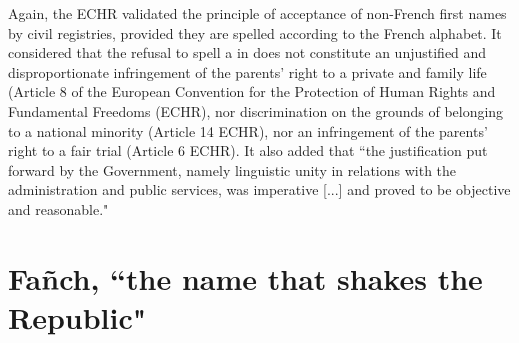 \documentclass[output=paper,colorlinks,citecolor=brown]{langscibook}
\begin{document}
Again, the ECHR validated the principle of acceptance of non-French first names by civil registries, provided they are spelled according to the French alphabet. It considered that the refusal to spell a  in  does not constitute an unjustified and disproportionate infringement of the parents' right to a private and family life (Article 8 of the European Convention for the Protection of Human Rights and Fundamental Freedoms (ECHR), nor discrimination on the grounds of belonging to a national minority (Article 14 ECHR), nor an infringement of the parents' right to a fair trial (Article 6 ECHR). It also added that ``the justification put forward by the Government, namely linguistic unity in relations with the administration and public services, was imperative [...] and proved to be objective and reasonable." 

\section{Fañch, ``the name that shakes the Republic" \citep{sm:Rouz2020}}

\end{document}
